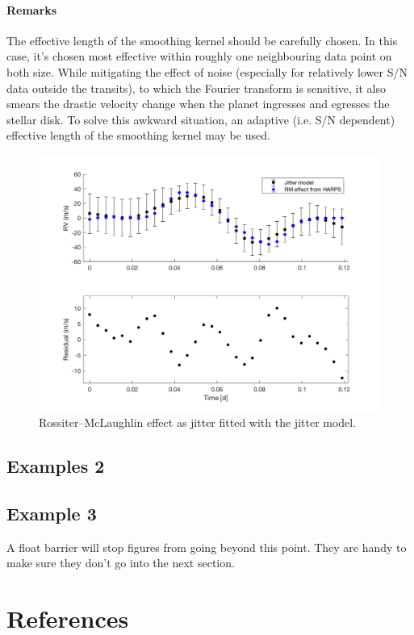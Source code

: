 \paragraph{Remarks}
The effective length of the smoothing kernel should be carefully chosen. In this case, it's chosen most effective within 
roughly one neighbouring data point on both size. While mitigating the effect of noise (especially for relatively lower
S/N data outside the transits), to which the Fourier transform is sensitive, it also smears the drastic velocity 
change when the planet ingresses and egresses the stellar disk. To solve this awkward situation, an adaptive 
(i.e. S/N dependent) effective length of the smoothing kernel may be used. 

\begin{figure}[tbp]
\centering
\includegraphics[width = 0.80 \linewidth]
{./Figures/Methods/9-RM_fit2.png}
\caption[Rossiter–McLaughlin effect as jitter]
{Rossiter–McLaughlin effect as jitter fitted with the jitter model.} 
\label{fig:rm_as_jitter}
\end{figure} 

\subsection{Examples 2}

\subsection{Example 3}




\FloatBarrier
A float barrier will stop figures from going beyond this point. They are handy to make sure they don't go into the next section.

\section{References}
\label{\thesection}
\vspace{-1.5cm}


